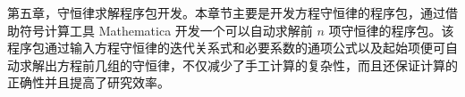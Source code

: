 第五章，守恒律求解程序包开发。本章节主要是开发方程守恒律的程序包，通过借助符号计算工具 Mathematica 开发一个可以自动求解前 $n$ 项守恒律的程序包。该程序包通过输入方程守恒律的迭代关系式和必要系数的通项公式以及起始项便可自动求解出方程前几组的守恒律，不仅减少了手工计算的复杂性，而且还保证计算的正确性并且提高了研究效率。












